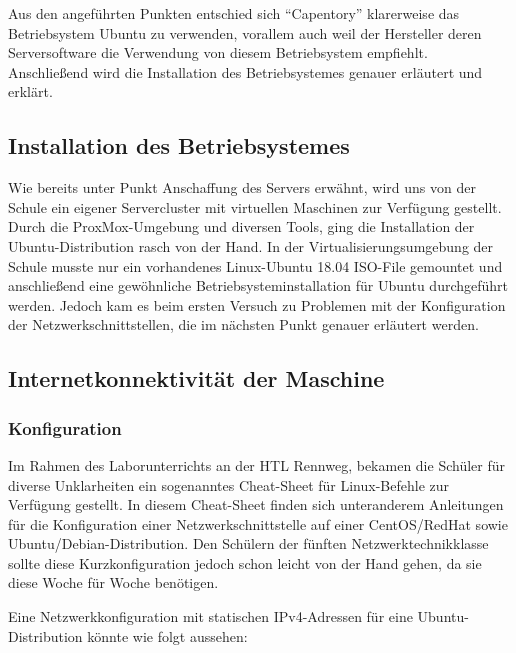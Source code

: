 Aus den angeführten Punkten entschied sich ``Capentory'' klarerweise das
Betriebsystem Ubuntu zu verwenden, vorallem auch weil der Hersteller
deren Serversoftware die Verwendung von diesem Betriebsystem empfiehlt.
Anschließend wird die Installation des Betriebsystemes genauer erläutert
und erklärt.

\hypertarget{installation-des-betriebsystemes}{%
\subsection{Installation des
Betriebsystemes}\label{installation-des-betriebsystemes}}

Wie bereits unter Punkt Anschaffung des Servers
 erwähnt, wird uns von der Schule ein
eigener Servercluster mit virtuellen Maschinen zur Verfügung gestellt.
Durch die ProxMox-Umgebung und diversen Tools, ging die Installation der
Ubuntu-Distribution rasch von der Hand. In der Virtualisierungsumgebung
der Schule musste nur ein vorhandenes Linux-Ubuntu 18.04 ISO-File
gemountet und anschließend eine gewöhnliche Betriebsysteminstallation
für Ubuntu durchgeführt werden. Jedoch kam es beim ersten Versuch zu
Problemen mit der Konfiguration der Netzwerkschnittstellen, die im
nächsten Punkt genauer erläutert werden.

\hypertarget{internetkonnektivituxe4t-der-maschine}{%
\subsection{Internetkonnektivität der
Maschine}\label{internetkonnektivituxe4t-der-maschine}}

\hypertarget{konfiguration}{%
\subsubsection{Konfiguration}\label{konfiguration}}

Im Rahmen des Laborunterrichts an der HTL Rennweg, bekamen die Schüler
für diverse Unklarheiten ein sogenanntes Cheat-Sheet \cite{cheat} für
Linux-Befehle zur Verfügung gestellt. In diesem Cheat-Sheet finden sich
unteranderem Anleitungen für die Konfiguration einer
Netzwerkschnittstelle auf einer CentOS/RedHat sowie
Ubuntu/Debian-Distribution. Den Schülern der fünften
Netzwerktechnikklasse sollte diese Kurzkonfiguration jedoch schon leicht
von der Hand gehen, da sie diese Woche für Woche benötigen.

Eine Netzwerkkonfiguration mit statischen IPv4-Adressen für eine
Ubuntu-Distribution könnte wie folgt aussehen:

